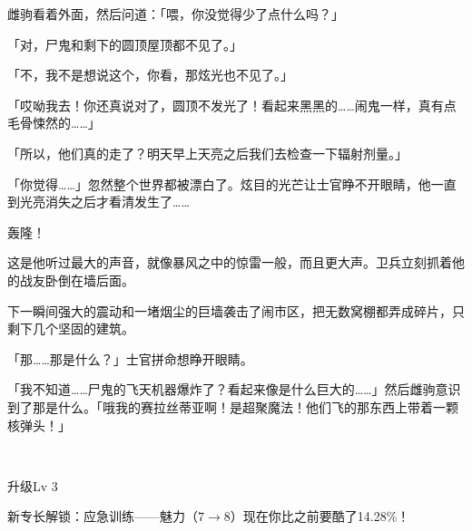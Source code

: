 雌驹看着外面，然后问道：「喂，你没觉得少了点什么吗？」

「对，尸鬼和剩下的圆顶屋顶都不见了。」

「不，我不是想说这个，你看，那炫光也不见了。」

「哎呦我去！你还真说对了，圆顶不发光了！看起来黑黑的……闹鬼一样，真有点毛骨悚然的……」

「所以，他们真的走了？明天早上天亮之后我们去检查一下辐射剂量。」

「你觉得……」忽然整个世界都被漂白了。炫目的光芒让士官睁不开眼睛，他一直到光亮消失之后才看清发生了……

轰隆！

这是他听过最大的声音，就像暴风之中的惊雷一般，而且更大声。卫兵立刻抓着他的战友卧倒在墙后面。

下一瞬间强大的震动和一堵烟尘的巨墙袭击了闹市区，把无数窝棚都弄成碎片，只剩下几个坚固的建筑。

「那……那是什么？」士官拼命想睁开眼睛。

「我不知道……尸鬼的飞天机器爆炸了？看起来像是什么巨大的……」然后雌驹意识到了那是什么。「哦我的赛拉丝蒂亚啊！是超聚魔法！他们飞的那东西上带着一颗核弹头！」

~\vfill

\begin{note}
    升级Lv 3

    新专长解锁：应急训练——魅力（$7 \to 8$）现在你比之前要酷了14.28\%！
\end{note}


